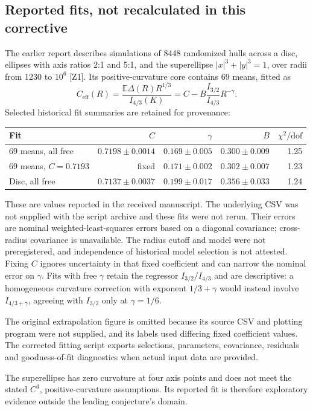 \documentclass[11pt,a4paper]{article}
\newcommand{\E}{\mathbb E}
\begin{document}
\subsection{Reported fits, not recalculated in this corrective}
The earlier report describes simulations of 8448 randomized hulls across a disc, ellipses with axis ratios 2:1 and 5:1, and the superellipse $|x|^3+|y|^3=1$, over radii from 1230 to $10^6$ [Z1]. Its positive-curvature core contains 69 means, fitted as
\[
 C_{\mathrm{eff}}(R)=\frac{\E\Delta(R)R^{1/3}}{I_{4/3}(K)}
 =C-B\frac{I_{3/2}}{I_{4/3}}R^{-\gamma}.
\]
Selected historical fit summaries are retained for provenance:
\begin{center}
\begin{tabular}{lrrrr}
\toprule
Fit & $C$ & $\gamma$ & $B$ & $\chi^2/\mathrm{dof}$\\
\midrule
69 means, all free & $0.7198\pm0.0014$ & $0.169\pm0.005$ & $0.300\pm0.009$ & 1.25\\
69 means, $C=0.7193$ & fixed & $0.171\pm0.002$ & $0.302\pm0.007$ & 1.23\\
Disc, all free & $0.7137\pm0.0037$ & $0.199\pm0.017$ & $0.356\pm0.033$ & 1.24\\
\bottomrule
\end{tabular}
\end{center}
These are values reported in the received manuscript. The underlying CSV was not supplied with the script archive and these fits were not rerun. Their errors are nominal weighted-least-squares errors based on a diagonal covariance; cross-radius covariance is unavailable. The radius cutoff and model were not preregistered, and independence of historical model selection is not attested. Fixing $C$ ignores uncertainty in that fixed coefficient and can narrow the nominal error on $\gamma$. Fits with free $\gamma$ retain the regressor $I_{3/2}/I_{4/3}$ and are descriptive: a homogeneous curvature correction with exponent $1/3+\gamma$ would instead involve $I_{4/3+\gamma}$, agreeing with $I_{3/2}$ only at $\gamma=1/6$.

The original extrapolation figure is omitted because its source CSV and plotting program were not supplied, and its labels used differing fixed coefficient values. The corrected fitting script exports selections, parameters, covariance, residuals and goodness-of-fit diagnostics when actual input data are provided.

The superellipse has zero curvature at four axis points and does not meet the stated $C^3$, positive-curvature assumptions. Its reported fit is therefore exploratory evidence outside the leading conjecture's domain.
\end{document}
